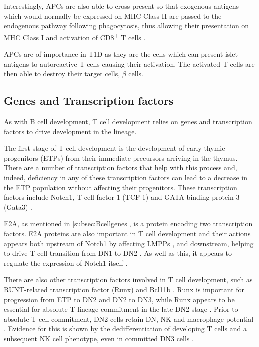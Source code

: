 Interestingly, APCs are also able to cross-present so that exogenous antigens which would normally be expressed on MHC Class II are passed to the endogenous pathway following phagocytosis, thus allowing their presentation on MHC Class I and activation of CD8\textsuperscript{+} T cells \citep{Rock2005}.

APCs are of importance in T1D as they are the cells which can present islet antigens to autoreactive T cells causing their activation.
The activated T cells are then able to destroy their target cells, $\beta$ cells.



\subsection{Genes and Transcription factors}
\label{subsec:Tcellgenes}

As with B cell development, T cell development relies on genes and transcription factors to drive development in the lineage.

The first stage of T cell development is the development of early thymic progenitors (ETPs) from their immediate precursors arriving in the thymus.
There are a number of transcription factors that help with this process and, indeed, deficiency in any of these transcription factors can lead to a decrease in the ETP population without affecting their progenitors.
These transcription factors include Notch1, T-cell factor 1 (TCF-1) and GATA-binding protein 3 (Gata3) \citep{Sambandam2005, Naito2011, Weber2011, Hosoya2009}.

E2A, as mentioned in \cref{subsec:Bcellgenes}, is a protein encoding two transcription factors.
E2A proteins are also important in T cell development and their actions appears both upstream of Notch1 by affecting LMPPs \citep{Dias2008}, and downstream, helping to drive T cell transition from DN1 to DN2 \citep{Naito2011}.
As well as this, it appears to regulate the expression of Notch1 itself \citep{Dias2008}.

There are also other transcription factors involved in T cell development, such as RUNT-related transcription factor (Runx) and Bcl11b \citep{Naito2011}.
Runx is important for progression from ETP to DN2 and DN2 to DN3, while Runx appears to be essential for absolute T lineage commitment in the late DN2 stage \citep{Liu2010, Naito2011}. 
Prior to absolute T cell commitment, DN2 cells retain DN, NK and macrophage potential \citep{Naito2011}.
Evidence for this is shown by the dedifferentiation of developing T cells and a subsequent NK cell phenotype, even in committed DN3 cells \citep{Liu2010}.

